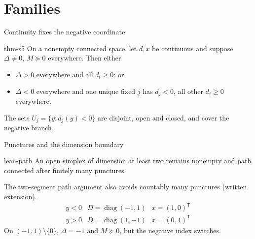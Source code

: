 \documentclass{beamer}
\begin{document}
\section{Families}
\begin{frame}{Continuity fixes the negative coordinate}
\begin{bookresult}{thm-s5}
On a nonempty connected space, let $d,x$ be continuous and suppose $\Delta\ne0$, $M\succeq0$ everywhere. Then either
\begin{itemize}
\item $\Delta>0$ everywhere and all $d_i\ge0$; or
\item $\Delta{}<0$ everywhere and one unique fixed $j$ has $d_j\mathrel{<}0$, all other $d_i\ge0$ everywhere.
\end{itemize}
\end{bookresult}
The sets $U_j=\{y:d_j(y)<0\}$ are disjoint, open and closed, and cover the negative branch.
\end{frame}
\begin{frame}{Punctures and the dimension boundary}
\begin{bookresult}{lean-path}
An open simplex of dimension at least two remains nonempty and path connected after finitely many punctures.
\end{bookresult}
The two-segment path argument also avoids countably many punctures (written extension).
\[
\begin{array}{c|c|c}
y<0&D=\operatorname{diag}(-1,1)&x=(1,0)^{\mathsf T}\\
y>0&D=\operatorname{diag}(1,-1)&x=(0,1)^{\mathsf T}
\end{array}
\]
On $(-1,1)\setminus\{0\}$, $\Delta=-1$ and $M\succeq0$, but the negative index switches.
\end{frame}
\end{document}
